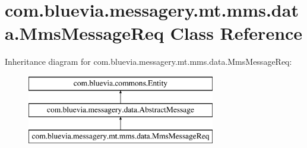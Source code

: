 \hypertarget{classcom_1_1bluevia_1_1messagery_1_1mt_1_1mms_1_1data_1_1MmsMessageReq}{
\section{com.bluevia.messagery.mt.mms.data.MmsMessageReq Class Reference}
\label{classcom_1_1bluevia_1_1messagery_1_1mt_1_1mms_1_1data_1_1MmsMessageReq}
}
Inheritance diagram for com.bluevia.messagery.mt.mms.data.MmsMessageReq:\begin{figure}[H]
\begin{center}
\leavevmode
\includegraphics[height=3.000000cm]{classcom_1_1bluevia_1_1messagery_1_1mt_1_1mms_1_1data_1_1MmsMessageReq}
\end{center}
\end{figure}
